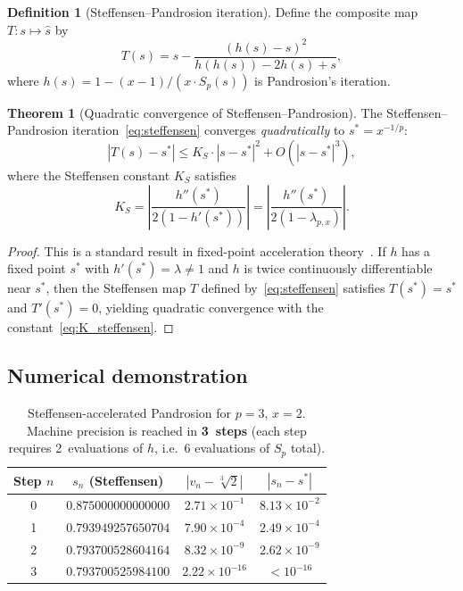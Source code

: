 \documentclass[11pt,a4paper]{article}
\theoremstyle{definition}
\newtheorem{definition}{Definition}[section]
\newtheorem{theorem}{Theorem}[section]
\newcommand{\cbrt}[1]{\sqrt[3]{#1}}
\begin{document}
\begin{definition}[Steffensen--Pandrosion iteration]
\label{def:steffensen}
Define the composite map $T : s \mapsto \hat{s}$ by
\begin{equation}
  \label{eq:steffensen}
  T(s) = s - \frac{(h(s) - s)^2}{h(h(s)) - 2h(s) + s},
\end{equation}
where $h(s) = 1 - (x-1)/(x \cdot S_p(s))$ is Pandrosion's iteration.
\end{definition}

\begin{theorem}[Quadratic convergence of Steffensen--Pandrosion]
\label{thm:steffensen}
The Steffensen--Pandrosion iteration~\eqref{eq:steffensen} converges \emph{quadratically} to $s^* = x^{-1/p}$:
\[
  |T(s) - s^*| \leq K_S \cdot |s - s^*|^2 + O(|s - s^*|^3),
\]
where the Steffensen constant $K_S$ satisfies
\begin{equation}
  \label{eq:K_steffensen}
  K_S = \left|\frac{h''(s^*)}{2(1 - h'(s^*))}\right| = \left|\frac{h''(s^*)}{2(1 - \lambda_{p,x})}\right|.
\end{equation}
\end{theorem}

\begin{proof}
This is a standard result in fixed-point acceleration theory~\cite{stoer}. If $h$ has a fixed point $s^*$ with $h'(s^*) = \lambda \neq 1$ and $h$ is twice continuously differentiable near $s^*$, then the Steffensen map $T$ defined by~\eqref{eq:steffensen} satisfies $T(s^*) = s^*$ and $T'(s^*) = 0$, yielding quadratic convergence with the constant~\eqref{eq:K_steffensen}.
\end{proof}

\subsection{Numerical demonstration}

\begin{table}[h]
\centering
\begin{tabular}{cccc}
\toprule
Step $n$ & $s_n$ (Steffensen) & $|v_n - \cbrt{2}|$ & $|s_n - s^*|$ \\
\midrule
0 & $0.875000000000000$ & $2.71 \times 10^{-1}$ & $8.13 \times 10^{-2}$ \\
1 & $0.793949257650704$ & $7.90 \times 10^{-4}$ & $2.49 \times 10^{-4}$ \\
2 & $0.793700528604164$ & $8.32 \times 10^{-9}$ & $2.62 \times 10^{-9}$ \\
3 & $0.793700525984100$ & $2.22 \times 10^{-16}$ & $< 10^{-16}$ \\
\bottomrule
\end{tabular}
\caption{Steffensen-accelerated Pandrosion for $p=3$, $x=2$. Machine precision is reached in \textbf{3~steps} (each step requires 2~evaluations of $h$, i.e.\ 6 evaluations of $S_p$ total).}
\end{table}
\end{document}
